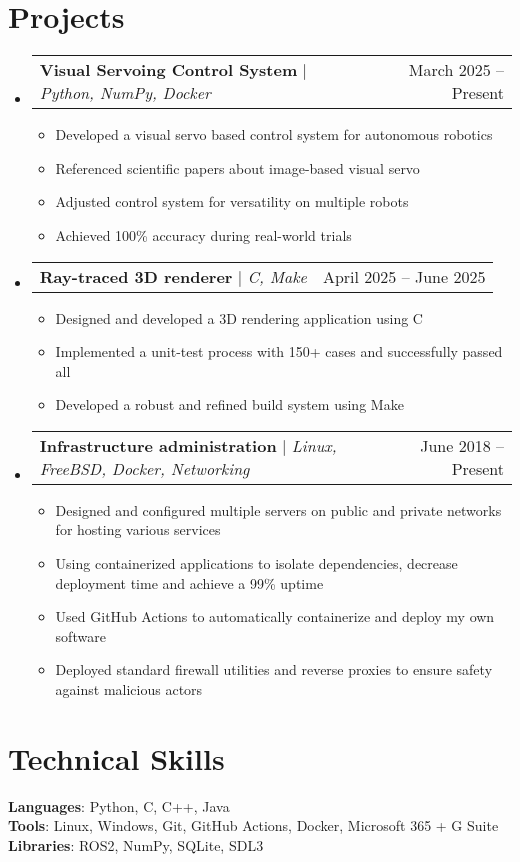 \documentclass[letterpaper,11pt]{article}
\makeatletter
\newcommand{\resumeItem}[1]{
  \item\small{
    {#1 \vspace{-2pt}}
  }
}
\newcommand{\resumeSubSubheading}[2]{
    \item
    \begin{tabular*}{0.97\textwidth}{l@{\extracolsep{\fill}}r}
      \textit{\small#1} & \textit{\small #2} \\
    \end{tabular*}\vspace{-7pt}
}
\newcommand{\resumeProjectHeading}[2]{
    \item
    \begin{tabular*}{0.97\textwidth}{l@{\extracolsep{\fill}}r}
      \small#1 & #2 \\
    \end{tabular*}\vspace{-7pt}
}
\newcommand{\resumeSubHeadingListStart}{\begin{itemize}[leftmargin=0.15in, label={}]}
\newcommand{\resumeSubHeadingListEnd}{\end{itemize}}
\newcommand{\resumeItemListStart}{\begin{itemize}}
\newcommand{\resumeItemListEnd}{\end{itemize}\vspace{-5pt}}
\makeatother
\begin{document}
\section{Projects}
    \resumeSubHeadingListStart
    	  \resumeProjectHeading
    	  	  {\textbf{Visual Servoing Control System} $|$ \emph{Python, NumPy, Docker}}{March 2025 -- Present}
          \resumeItemListStart
            \resumeItem{Developed a visual servo based control system for autonomous robotics}
            \resumeItem{Referenced scientific papers about image-based visual servo}
            \resumeItem{Adjusted control system for versatility on multiple robots}
            \resumeItem{Achieved 100\% accuracy during real-world trials}
          \resumeItemListEnd
      \resumeProjectHeading
          {\textbf{Ray-traced 3D renderer} $|$ \emph{C, Make}}{April 2025 -- June 2025}
          \resumeItemListStart
            \resumeItem{Designed and developed a 3D rendering application using C}
            \resumeItem{Implemented a unit-test process with 150+ cases and successfully passed all}
            \resumeItem{Developed a robust and refined build system using Make}
          \resumeItemListEnd
      \resumeProjectHeading
          {\textbf{Infrastructure administration} $|$ \emph{Linux, FreeBSD, Docker, Networking}}{June 2018 -- Present}
          \resumeItemListStart
            \resumeItem{Designed and configured multiple servers on public and private networks for hosting various services}
            \resumeItem{Using containerized applications to isolate dependencies, decrease deployment time and achieve a 99\% uptime}
            \resumeItem{Used GitHub Actions to automatically containerize and deploy my own software}
            \resumeItem{Deployed standard firewall utilities and reverse proxies to ensure safety against malicious actors}
          \resumeItemListEnd
    \resumeSubHeadingListEnd

\section{Technical Skills}
 \begin{itemize}[leftmargin=0.15in, label={}]
    \small{\item{
     \textbf{Languages}{: Python, C, C++, Java} \\
     \textbf{Tools}{: Linux, Windows, Git, GitHub Actions, Docker, Microsoft 365 + G Suite} \\
     \textbf{Libraries}{: ROS2, NumPy, SQLite, SDL3}
    }}
 \end{itemize}
      

\end{document}
